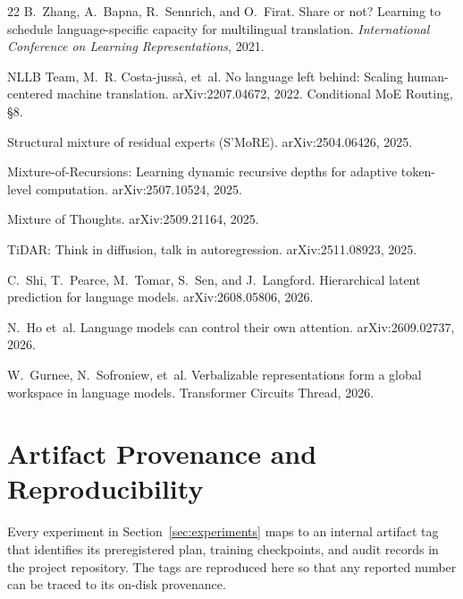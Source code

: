 \documentclass[10pt,a4paper]{article}
\begin{document}
\begin{thebibliography}{22}
B.~Zhang, A.~Bapna, R.~Sennrich, and O.~Firat.
Share or not? Learning to schedule language-specific capacity for
multilingual translation.
\emph{International Conference on Learning Representations}, 2021.

NLLB Team, M.~R. Costa-juss\`a, et~al.
No language left behind: Scaling human-centered machine translation.
arXiv:2207.04672, 2022. Conditional MoE Routing, \S8.

Structural mixture of residual experts (S'MoRE).
arXiv:2504.06426, 2025.

Mixture-of-Recursions: Learning dynamic recursive depths for adaptive
token-level computation.
arXiv:2507.10524, 2025.

Mixture of Thoughts.
arXiv:2509.21164, 2025.

TiDAR: Think in diffusion, talk in autoregression.
arXiv:2511.08923, 2025.

C.~Shi, T.~Pearce, M.~Tomar, S.~Sen, and J.~Langford.
Hierarchical latent prediction for language models.
arXiv:2608.05806, 2026.

N.~Ho et~al.
Language models can control their own attention.
arXiv:2609.02737, 2026.

W.~Gurnee, N.~Sofroniew, et~al.
Verbalizable representations form a global workspace in language models.
Transformer Circuits Thread, 2026.

\end{thebibliography}

\appendix
\section{Artifact Provenance and Reproducibility}
\label{app:provenance}

Every experiment in Section~\ref{sec:experiments} maps to an internal artifact
tag that identifies its preregistered plan, training checkpoints, and audit
records in the project repository. The tags are reproduced here so that
any reported number can be traced to its on-disk provenance.
\end{document}
